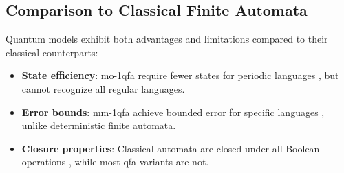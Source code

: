 \subsection{Comparison to Classical Finite Automata}
\label{subsec:classical-comparison}
Quantum models exhibit both advantages and limitations compared to their classical counterparts:
\begin{itemize}
    \item \textbf{State efficiency}: \gls{mo-1qfa} require fewer states for periodic languages \cite{kondacs1997power}, but cannot recognize all regular languages.
    \item \textbf{Error bounds}: \gls{mm-1qfa} achieve bounded error for specific languages \cite{ambainis1998}, unlike deterministic finite automata.
    \item \textbf{Closure properties}: Classical automata are closed under all Boolean operations \cite{rabin1959}, while most \gls{qfa} variants are not.
\end{itemize}
